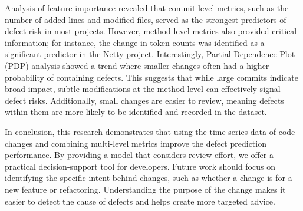Analysis of feature importance revealed that commit-level metrics, such as the number of added lines and modified files, served as the strongest predictors of defect risk in most projects. However, method-level metrics also provided critical information; for instance, the change in token counts was identified as a significant predictor in the Netty project. Interestingly, Partial Dependence Plot (PDP) analysis showed a trend where smaller changes often had a higher probability of containing defects. This suggests that while large commits indicate broad impact, subtle modifications at the method level can effectively signal defect risks. Additionally, small changes are easier to review, meaning defects within them are more likely to be identified and recorded in the dataset.

In conclusion, this research demonstrates that using the time-series data of code changes and combining multi-level metrics improve the defect prediction performance. By providing a model that considers review effort, we offer a practical decision-support tool for developers. Future work should focus on identifying the specific intent behind changes, such as whether a change is for a new feature or refactoring. Understanding the purpose of the change makes it easier to detect the cause of defects and helps create more targeted advice.